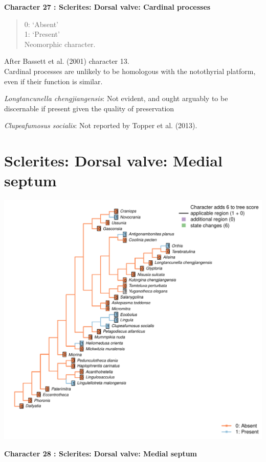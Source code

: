 \documentclass[]{book}
\theoremstyle{definition}
\theoremstyle{definition}
\theoremstyle{definition}
\theoremstyle{remark}
\begin{document}
\textbf{Character 27 : Sclerites: Dorsal valve: Cardinal processes }

\begin{quote}
0: `Absent'\\
1: `Present'\\
Neomorphic character.
\end{quote}

After Bassett et al. (2001) character 13.\\
Cardinal processes are unlikely to be homologous with the notothyrial
platform, even if their function is similar.

\emph{Longtancunella chengjiangensis}: Not evident, and ought arguably
to be discernable if present given the quality of preservation

\emph{Clupeafumosus socialis}: Not reported by Topper et al. (2013).

\hypertarget{sclerites-dorsal-valve-medial-septum}{%
\section*{Sclerites: Dorsal valve: Medial
septum}\label{sclerites-dorsal-valve-medial-septum}}

\includegraphics{Brachiopod_phylogeny_files/figure-latex/unnamed-chunk-5-28.pdf}

\textbf{Character 28 : Sclerites: Dorsal valve: Medial septum }
\end{document}
